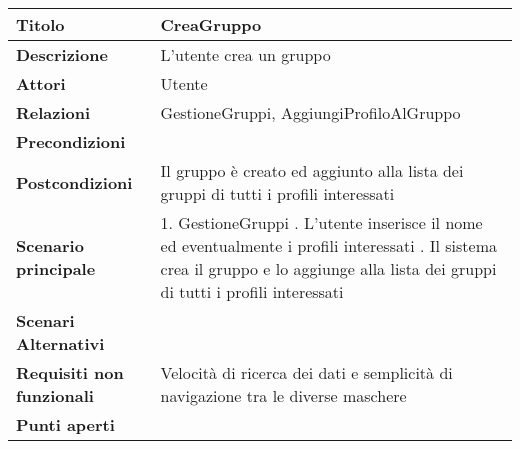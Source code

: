 \begin{tabular} {|P{4.5cm}|P{12.5cm}|}
  \hline
  \textbf{Titolo}                   & CreaGruppo                                                                          \\
  \hline
  \textbf{Descrizione}              & L'utente crea un gruppo                                                             \\
  \hline
  \textbf{Attori}                   & Utente                                                                              \\
  \hline
  \textbf{Relazioni}                & GestioneGruppi, AggiungiProfiloAlGruppo                                             \\
  \hline
  \textbf{Precondizioni}            &                                                                                     \\
  \hline
  \textbf{Postcondizioni}           & Il gruppo è creato ed aggiunto alla lista dei gruppi di tutti i profili interessati \\
  \hline
  \textbf{Scenario principale}      & 1. GestioneGruppi . L'utente inserisce il nome ed eventualmente i profili interessati . Il sistema crea il gruppo e lo aggiunge alla lista dei gruppi di tutti i profili interessati\linebreak               \\
  \hline
  \textbf{Scenari Alternativi}      &                                                                                     \\
  \hline
  \textbf{Requisiti non funzionali} & Velocità di ricerca dei dati e semplicità di navigazione tra le diverse maschere    \\
  \hline
  \textbf{Punti aperti}             &                                                                                     \\
  \hline
\end{tabular}
\hfill
\break

